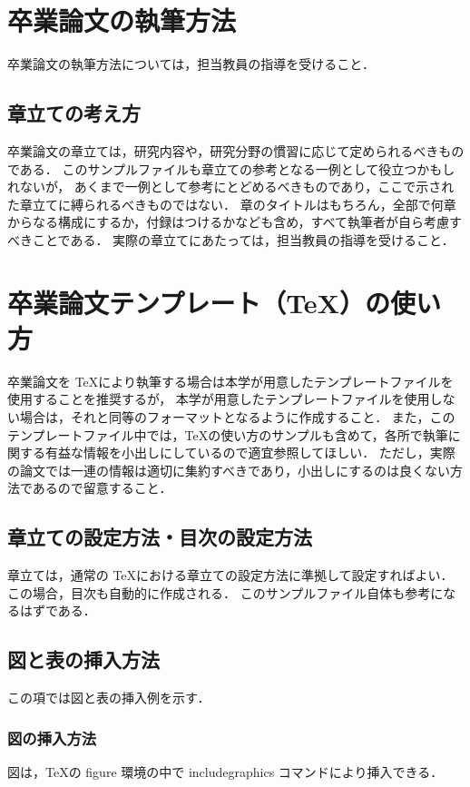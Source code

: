 \section{卒業論文の執筆方法}
卒業論文の執筆方法については，担当教員の指導を受けること．

\subsection{章立ての考え方}
卒業論文の章立ては，研究内容や，研究分野の慣習に応じて定められるべきものである．
このサンプルファイルも章立ての参考となる一例として役立つかもしれないが，
あくまで一例として参考にとどめるべきものであり，ここで示された章立てに縛られるべきものではない．
章のタイトルはもちろん，全部で何章からなる構成にするか，付録はつけるかなども含め，すべて執筆者が自ら考慮すべきことである．
実際の章立てにあたっては，担当教員の指導を受けること．

\section{卒業論文テンプレート（TeX）の使い方}

卒業論文を \TeX により執筆する場合は本学が用意したテンプレートファイルを使用することを推奨するが，
本学が用意したテンプレートファイルを使用しない場合は，それと同等のフォーマットとなるように作成すること．
また，このテンプレートファイル中では，\TeX の使い方のサンプルも含めて，各所で執筆に関する有益な情報を小出しにしているので適宜参照してほしい．
ただし，実際の論文では一連の情報は適切に集約すべきであり，小出しにするのは良くない方法であるので留意すること．

\subsection{章立ての設定方法・目次の設定方法}
章立ては，通常の \TeX における章立ての設定方法に準拠して設定すればよい．この場合，目次も自動的に作成される．
このサンプルファイル自体も参考になるはずである．

\subsection{図と表の挿入方法}
この項では図と表の挿入例を示す．

\subsubsection{図の挿入方法}
図は，\TeX の figure 環境の中で includegraphics コマンドにより挿入できる．

